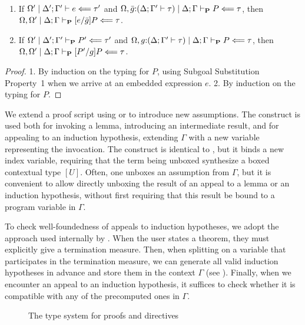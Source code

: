 \begin{thm} ~
  \begin{enumerate}
  \item
    If $\Omega^\prime\mid\Delta^\prime; \Gamma^\prime \vdash e \Longleftarrow \tau^\prime$
    and $\Omega,\bar g{:}(\Delta; \Gamma^\prime \vdash \tau)\mid\Delta; \Gamma \vdash_\mathbf{P} P \Longleftarrow \tau$,
    then
    $\prfchkjudg{%
      \Omega,\Omega^\prime\mid\goalctx{}%
    }{\psubst{e/\bar g}{P}}{\tau}$.

  \item
    If $\Omega^\prime\mid\Delta^\prime; \Gamma^\prime \vdash_\mathbf{P} P^\prime \Longleftarrow \tau^\prime$
    and $\Omega,g{:}(\Delta; \Gamma^\prime \vdash \tau)\mid\Delta; \Gamma \vdash_\mathbf{P} P \Longleftarrow \tau$,
    then
    $\prfchkjudg{%
      \Omega,\Omega^\prime\mid\goalctx{}%
    }{\psubst{P^\prime/g}{P}}{\tau}$.
  \end{enumerate}
\end{thm}
\begin{proof}
  1. By induction on the typing for $P$, using Subgoal Substitution Property~1
  when we arrive at an embedded expression $e$.
  2. By induction on the typing for $P$.
\end{proof}
%
We extend a proof script using \kwby{} or \kwunbox{} to introduce new
assumptions.
The \kwby{} construct is used both for invoking a lemma, introducing
an intermediate result, and for appealing to an
induction hypothesis, extending $\Gamma$ with a new variable representing the
invocation.
The \kwunbox{} construct is identical to \kwby, but it binds a new
index variable, requiring that the term being unboxed synthesize a boxed
contextual type $[U]$.
Often, one unboxes an assumption from $\Gamma$, but it is convenient to allow
directly unboxing the result of an appeal to a lemma or an induction hypothesis,
without first requiring that this result be bound to a program variable in
$\Gamma$.

To check well-foundedness of appeals to induction hypotheses, we adopt the
approach used internally by \Beluga.
When the user states a theorem, they must explicitly give a termination measure.
Then, when splitting on a variable that participates in the termination measure,
we can generate all valid induction hypotheses in advance and store them in the
context $\Gamma$ (see \cite{Pientka:TLCA15}).
Finally, when we encounter an appeal to an induction hypothesis, it suffices to
check whether it is compatible with any of the precomputed ones in $\Gamma$.

\begin{figure}[tp]
  \caption{%
    The type system for \Harpoon{} proofs and directives%
  }%
  \label{fig:harpoon-types}%
\end{figure}

